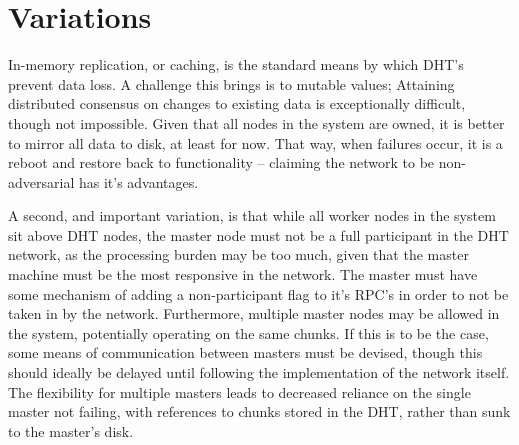 \documentclass[10pt, a4paper]{article}
\begin{document}
\section{Variations}

In-memory replication, or caching, is the standard means by which DHT's prevent data loss.
A challenge this brings is to mutable values;
Attaining distributed consensus on changes to existing data is exceptionally difficult, though not impossible.
Given that all nodes in the system are owned, it is better to mirror all data to disk, at least for now.
That way, when failures occur, it is a reboot and restore back to functionality -- claiming the network to be non-adversarial has it's advantages.

A second, and important variation, is that while all worker nodes in the system sit above DHT nodes, the master node must not be a full participant in the DHT network, as the processing burden may be too much, given that the master machine must be the most responsive in the network.
The master must have some mechanism of adding a non-participant flag to it's RPC's in order to not be taken in by the network.
Furthermore, multiple master nodes may be allowed in the system, potentially operating on the same chunks.
If this is to be the case, some means of communication between masters must be devised, though this should ideally be delayed until following the implementation of the network itself.
The flexibility for multiple masters leads to decreased reliance on the single master not failing, with references to chunks stored in the DHT, rather than sunk to the master's disk.

\end{document}
